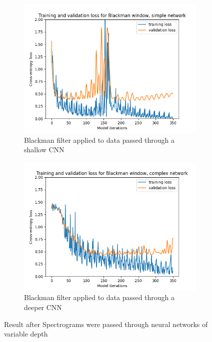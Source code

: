 \begin{figure}[hbt!]
\begin{subfigure}[b]{0.5\textwidth}
        \includegraphics[width=\linewidth]{Images/blackmanSimple.png}
        \caption{Blackman filter applied to data passed through a shallow CNN}
        \label{fig:BlackmanShallow}
    \end{subfigure}
    \hfill
    \begin{subfigure}[b]{0.5\textwidth}
        \includegraphics[width=\linewidth]{Images/blackmanComplex.png}
        \caption{Blackman filter applied to data passed through a deeper CNN}
        \label{fig:BlackmanDeeper}
    \end{subfigure}
    \caption{Result after Spectrograms were passed through neural networks of variable depth}
    \label{fig:SpecCNN}
\end{figure}

